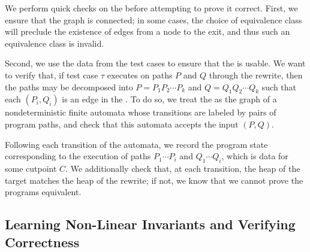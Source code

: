 We perform quick checks on the \bisimrep{} before attempting to prove
it correct. First, we ensure that the graph is connected; in some
cases, the choice of equivalence class will preclude the existence of
edges from a node to the exit, and thus such an equivalence class is
invalid.

Second, we use the data from the test cases to ensure that the
\bisimrep{} is usable. We want to verify that, if test case $\tau$
executes on paths $P$ and $Q$ through the rewrite, then the paths
may be decomposed into $P = P_1P_2\dotsm P_k$ and $Q = Q_1Q_2\dotsm
Q_k$ such that each $(P_i, Q_i)$ is an edge in the \bisimrep. To do
so, we treat the \bisimrep as the graph of a nondeterministic finite
automata whose transitions are labeled by pairs of program paths, and
check that this automata accepts the input $(P, Q)$. 

Following each transition of the automata, we record the program state
corresponding to the execution of paths $P_1\dotsm P_i$ and $Q_1
\dotsm Q_i$, which is data for some cutpoint $C$. We additionally
check that, at each transition, the heap of the target matches the
heap of the rewrite; if not, we know that we cannot prove the programs
equivalent.

\subsection{Learning Non-Linear Invariants and Verifying Correctness} \label{algstep6}


